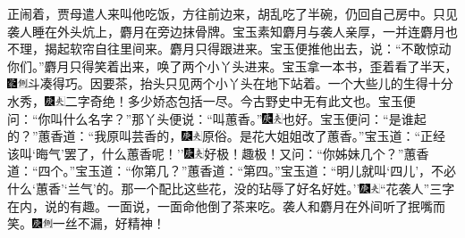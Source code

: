 正闹着，贾母遣人来叫他吃饭，方往前边来，胡乱吃了半碗，仍回自己房中。只见袭人睡在外头炕上，麝月在旁边抹骨牌。宝玉素知麝月与袭人亲厚，一并连麝月也不理，揭起软帘自往里间来。麝月只得跟进来。宝玉便推他出去，说：``不敢惊动你们。''麝月只得笑着出来，唤了两个小丫头进来。宝玉拿一本书，歪着看了半天，{\includegraphics[width=3mm]{../Images/00006}\includegraphics[width=3mm]{../Images/00011}\footnotesize \kaishu 斗凑得巧。}因要茶，抬头只见两个小丫头在地下站着。一个大些儿的生得十分水秀，{\includegraphics[width=3mm]{../Images/00004}\includegraphics[width=3mm]{../Images/00012}\footnotesize \kaishu 二字奇绝！多少娇态包括一尽。今古野史中无有此文也。}宝玉便问：``你叫什么名字？''那丫头便说：``叫蕙香。''{\includegraphics[width=3mm]{../Images/00004}\includegraphics[width=3mm]{../Images/00012}\footnotesize \kaishu 也好。}宝玉便问：``是谁起的？''蕙香道：``我原叫芸香的，{\includegraphics[width=3mm]{../Images/00004}\includegraphics[width=3mm]{../Images/00012}\footnotesize \kaishu 原俗。}是花大姐姐改了蕙香。''宝玉道：``正经该叫`晦气'罢了，什么蕙香呢！''{\includegraphics[width=3mm]{../Images/00004}\includegraphics[width=3mm]{../Images/00012}\footnotesize \kaishu 好极！趣极！}又问：``你姊妹几个？''蕙香道：``四个。''宝玉道：``你第几？''蕙香道：``第四。''宝玉道：``明儿就叫`四儿'，不必什么`蕙香'`兰气'的。那一个配比这些花，没的玷辱了好名好姓。''{\includegraphics[width=3mm]{../Images/00004}\includegraphics[width=3mm]{../Images/00012}\footnotesize \kaishu ``花袭人''三字在内，说的有趣。}一面说，一面命他倒了茶来吃。袭人和麝月在外间听了抿嘴而笑。{\includegraphics[width=3mm]{../Images/00004}\includegraphics[width=3mm]{../Images/00011}\footnotesize \kaishu 一丝不漏，好精神！}

